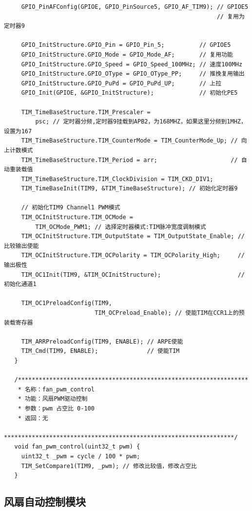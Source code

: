 \begin{lstlisting}
     GPIO_PinAFConfig(GPIOE, GPIO_PinSource5, GPIO_AF_TIM9); // GPIOE5
                                                             // 复用为定时器9

     GPIO_InitStructure.GPIO_Pin = GPIO_Pin_5;          // GPIOE5
     GPIO_InitStructure.GPIO_Mode = GPIO_Mode_AF;       // 复用功能
     GPIO_InitStructure.GPIO_Speed = GPIO_Speed_100MHz; // 速度100MHz
     GPIO_InitStructure.GPIO_OType = GPIO_OType_PP;     // 推挽复用输出
     GPIO_InitStructure.GPIO_PuPd = GPIO_PuPd_UP;       // 上拉
     GPIO_Init(GPIOE, &GPIO_InitStructure);             // 初始化PE5

     TIM_TimeBaseStructure.TIM_Prescaler =
         psc; // 定时器分频,定时器9挂载到APB2，为168MHZ，如果这里分频到1MHZ，设置为167
     TIM_TimeBaseStructure.TIM_CounterMode = TIM_CounterMode_Up; // 向上计数模式
     TIM_TimeBaseStructure.TIM_Period = arr;                     // 自动重装载值
     TIM_TimeBaseStructure.TIM_ClockDivision = TIM_CKD_DIV1;
     TIM_TimeBaseInit(TIM9, &TIM_TimeBaseStructure); // 初始化定时器9

     // 初始化TIM9 Channel1 PWM模式
     TIM_OCInitStructure.TIM_OCMode =
         TIM_OCMode_PWM1; // 选择定时器模式:TIM脉冲宽度调制模式
     TIM_OCInitStructure.TIM_OutputState = TIM_OutputState_Enable; // 比较输出使能
     TIM_OCInitStructure.TIM_OCPolarity = TIM_OCPolarity_High;     // 输出极性
     TIM_OC1Init(TIM9, &TIM_OCInitStructure);                      // 初始化通道1

     TIM_OC1PreloadConfig(TIM9,
                          TIM_OCPreload_Enable); // 使能TIM在CCR1上的预装载寄存器

     TIM_ARRPreloadConfig(TIM9, ENABLE); // ARPE使能
     TIM_Cmd(TIM9, ENABLE);              // 使能TIM
   }

   /******************************************************************
    * 名称：fan_pwm_control
    * 功能：风扇PWM驱动控制
    * 参数：pwm 占空比 0-100
    * 返回：无
    ******************************************************************/
   void fan_pwm_control(uint32_t pwm) {
     uint32_t _pwm = cycle / 100 * pwm;
     TIM_SetCompare1(TIM9, _pwm); // 修改比较值，修改占空比
   }
\end{lstlisting}

\subsection{风扇自动控制模块}

